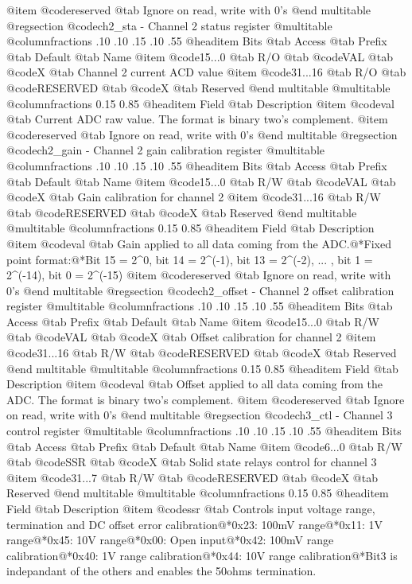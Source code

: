 @item @code{reserved} @tab Ignore on read, write with 0's
@end multitable
@regsection @code{ch2_sta} - Channel 2 status register
@multitable @columnfractions .10 .10 .15 .10 .55
@headitem Bits @tab Access @tab Prefix @tab Default @tab Name
@item @code{15...0}
@tab R/O @tab
@code{VAL}
@tab @code{X} @tab 
Channel 2 current ACD value
@item @code{31...16}
@tab R/O @tab
@code{RESERVED}
@tab @code{X} @tab 
Reserved
@end multitable
@multitable @columnfractions 0.15 0.85
@headitem Field @tab Description
@item @code{val} @tab Current ADC raw value. The format is binary two's complement.
@item @code{reserved} @tab Ignore on read, write with 0's
@end multitable
@regsection @code{ch2_gain} - Channel 2 gain calibration register
@multitable @columnfractions .10 .10 .15 .10 .55
@headitem Bits @tab Access @tab Prefix @tab Default @tab Name
@item @code{15...0}
@tab R/W @tab
@code{VAL}
@tab @code{X} @tab 
Gain calibration for channel 2
@item @code{31...16}
@tab R/W @tab
@code{RESERVED}
@tab @code{X} @tab 
Reserved
@end multitable
@multitable @columnfractions 0.15 0.85
@headitem Field @tab Description
@item @code{val} @tab Gain applied to all data coming from the ADC.@*Fixed point format:@*Bit 15 = 2^0, bit 14 = 2^(-1), bit 13 = 2^(-2), ... , bit 1 = 2^(-14), bit 0 = 2^(-15)
@item @code{reserved} @tab Ignore on read, write with 0's
@end multitable
@regsection @code{ch2_offset} - Channel 2 offset calibration register
@multitable @columnfractions .10 .10 .15 .10 .55
@headitem Bits @tab Access @tab Prefix @tab Default @tab Name
@item @code{15...0}
@tab R/W @tab
@code{VAL}
@tab @code{X} @tab 
Offset calibration for channel 2
@item @code{31...16}
@tab R/W @tab
@code{RESERVED}
@tab @code{X} @tab 
Reserved
@end multitable
@multitable @columnfractions 0.15 0.85
@headitem Field @tab Description
@item @code{val} @tab Offset applied to all data coming from the ADC. The format is binary two's complement.
@item @code{reserved} @tab Ignore on read, write with 0's
@end multitable
@regsection @code{ch3_ctl} - Channel 3 control register
@multitable @columnfractions .10 .10 .15 .10 .55
@headitem Bits @tab Access @tab Prefix @tab Default @tab Name
@item @code{6...0}
@tab R/W @tab
@code{SSR}
@tab @code{X} @tab 
Solid state relays control for channel 3
@item @code{31...7}
@tab R/W @tab
@code{RESERVED}
@tab @code{X} @tab 
Reserved
@end multitable
@multitable @columnfractions 0.15 0.85
@headitem Field @tab Description
@item @code{ssr} @tab Controls input voltage range, termination and DC offset error calibration@*0x23: 100mV range@*0x11: 1V range@*0x45: 10V range@*0x00: Open input@*0x42: 100mV range calibration@*0x40: 1V range calibration@*0x44: 10V range calibration@*Bit3 is indepandant of the others and enables the 50ohms termination.
